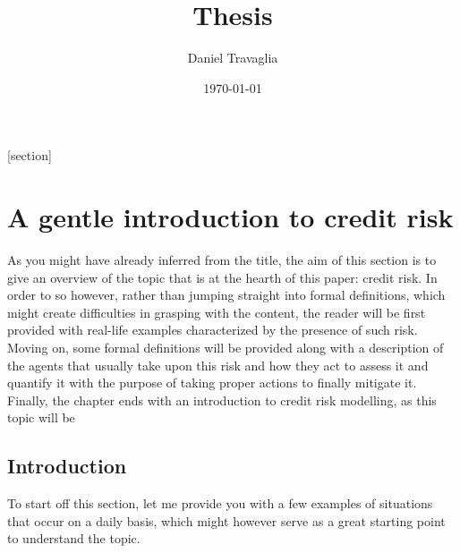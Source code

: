 \documentclass[a4paper,12pt]{article}
\begin{document}
    [section]
    \newenvironment{definition}[1][]{\refstepcounter{definition}\par\medskip
        \noindent \textbf{Definition #1:} \rmfamily}{\medskip}
    
    \title{Thesis}
    \author{Daniel Travaglia}
    \date{\today}
    \maketitle

    \pagebreak

    \pagebreak
    
    \section{A gentle introduction to credit risk}

    As you might have already inferred from the title, the aim of this section is to give an overview
    of the topic that is at the hearth of this paper: credit risk. In order to so however, rather than jumping 
    straight into formal definitions, which might create difficulties in grasping with the content, the reader 
    will be first provided with real-life examples characterized by the presence of such risk. Moving on, some
    formal definitions will be provided along with a description of the agents that usually take upon this risk 
    and how they act to assess it and quantify it with the purpose of taking proper actions to finally mitigate it. 
    Finally, the chapter ends with an introduction to credit risk modelling, as this topic will be  

    \subsection[]{Introduction}
            
        To start off this section, let me provide you with a few examples of situations that occur on a daily basis, which
        might however serve as a great starting point to understand the topic. 
    
\end{document}
